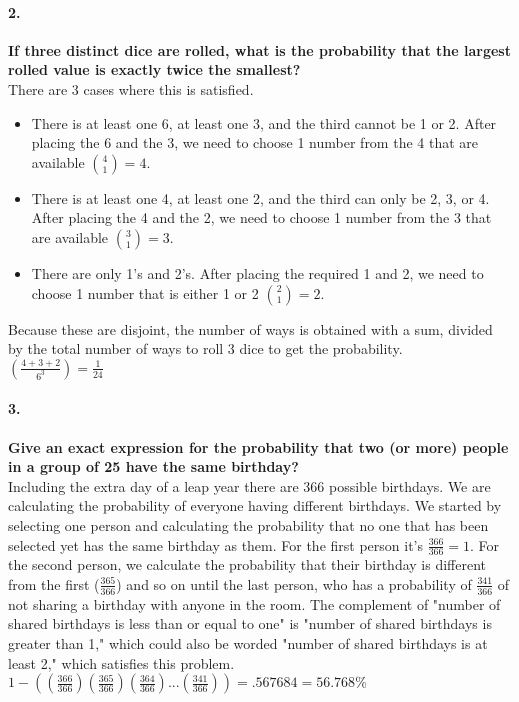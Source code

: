 \documentclass{article}
\begin{document}
\paragraph{2. }
\textbf{If three distinct dice are rolled, what is the probability that the largest rolled value is exactly twice the smallest?}\\
There are 3 cases where this is satisfied. 
\begin{itemize}
\item There is at least one 6, at least one 3, and the third cannot be 1 or 2. After placing the 6 and the 3, we need to choose 1 number from the 4 that are available ${4 \choose 1} = 4$.
\item There is at least one 4, at least one 2, and the third can only be 2, 3, or 4. After placing the 4 and the 2, we need to choose 1 number from the 3 that are available ${3 \choose 1} = 3$.
\item There are only 1's and 2's. After placing the required 1 and 2, we need to choose 1 number that is either 1 or 2 ${2 \choose 1} = 2$.
\end{itemize}
Because these are disjoint, the number of ways is obtained with a sum, divided by the total number of ways to roll 3 dice to get the probability.\\
$\boxed{\left( \frac{4+3+2}{6^3} \right) = \frac{1}{24}}$

\pagebreak

\paragraph{3. }
\textbf{Give an exact expression for the probability that two (or more) people in a group of 25 have the same birthday?}\\
Including the extra day of a leap year there are 366 possible birthdays. We are calculating the probability of everyone having different birthdays. We started by selecting one person and calculating the probability that no one that has been selected yet has the same birthday as them. For the first person it's $\frac{366}{366} = 1$. For the second person, we calculate the probability that their birthday is different from the first ($\frac{365}{366}$) and so on until the last person, who has a probability of $\frac{341}{366}$ of not sharing a birthday with anyone in the room. The complement of "number of shared birthdays is less than or equal to one" is "number of shared birthdays is greater than 1," which could also be worded "number of shared birthdays is at least 2," which satisfies this problem.\\
$\boxed{1 - ((\frac{366}{366}) (\frac{365}{366}) (\frac{364}{366}) ... (\frac{341}{366})) = .567684 = 56.768\%}$
\end{document}
